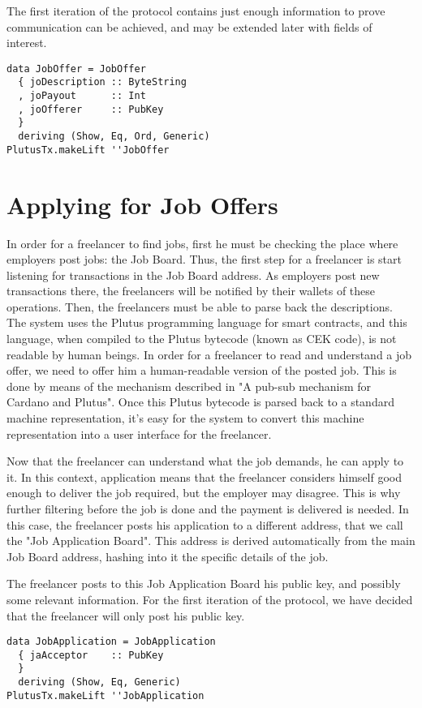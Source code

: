 \documentclass{article}
\begin{document}
The first iteration of the protocol contains just enough information to prove communication can be achieved, and may be extended later with fields of interest.

\begin{verbatim}
data JobOffer = JobOffer
  { joDescription :: ByteString
  , joPayout      :: Int
  , joOfferer     :: PubKey
  }
  deriving (Show, Eq, Ord, Generic)
PlutusTx.makeLift ''JobOffer
\end{verbatim}


\section{Applying for Job Offers}

In order for a freelancer to find jobs, first he must be checking the place where employers post jobs: the Job Board. Thus, the first step for a freelancer is start listening for transactions in the Job Board address. As employers post new transactions there, the freelancers will be notified by their wallets of these operations. Then, the freelancers must be able to parse back the descriptions. The system uses the Plutus programming language for smart contracts, and this language, when compiled to the Plutus bytecode (known as CEK code), is not readable by human beings. In order for a freelancer to read and understand a job offer, we need to offer him a human-readable version of the posted job. This is done by means of the mechanism described in "A pub-sub mechanism for Cardano and Plutus"\cite{pub-sub-paper}. Once this Plutus bytecode is parsed back to a standard machine representation, it's easy for the system to convert this machine representation into a user interface for the freelancer.

Now that the freelancer can understand what the job demands, he can apply to it. In this context, application means that the freelancer considers himself good enough to deliver the job required, but the employer may disagree. This is why further filtering before the job is done and the payment is delivered is needed. In this case, the freelancer posts his application to a different address, that we call the "Job Application Board". This address is derived automatically from the main Job Board address, hashing into it the specific details of the job.

The freelancer posts to this Job Application Board his public key, and possibly some relevant information. For the first iteration of the protocol, we have decided that the freelancer will only post his public key.
\begin{verbatim}
data JobApplication = JobApplication
  { jaAcceptor    :: PubKey
  }
  deriving (Show, Eq, Generic)
PlutusTx.makeLift ''JobApplication
\end{verbatim}
\end{document}
